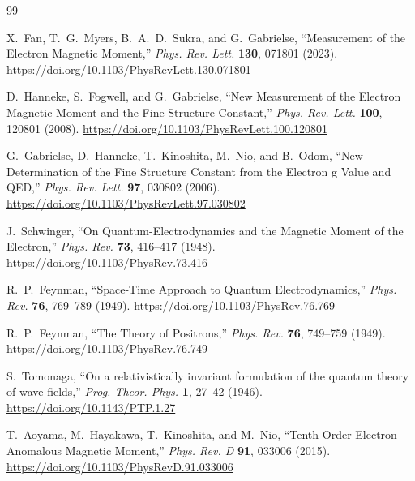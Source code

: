 \documentclass[%
 reprint,
 amsmath,amssymb,
 aps,
]{revtex4-1}
\numberwithin{equation}{section}%
\begin{document}
\begin{thebibliography}{99}

X.~Fan, T.~G.~Myers, B.~A.~D.~Sukra, and G.~Gabrielse, 
``Measurement of the Electron Magnetic Moment,'' 
\textit{Phys. Rev. Lett.} \textbf{130}, 071801 (2023). 
\href{https://doi.org/10.1103/PhysRevLett.130.071801}{https://doi.org/10.1103/PhysRevLett.130.071801}

D.~Hanneke, S.~Fogwell, and G.~Gabrielse, 
``New Measurement of the Electron Magnetic Moment and the Fine Structure Constant,'' 
\textit{Phys. Rev. Lett.} \textbf{100}, 120801 (2008). 
\href{https://doi.org/10.1103/PhysRevLett.100.120801}{https://doi.org/10.1103/PhysRevLett.100.120801}

G.~Gabrielse, D.~Hanneke, T.~Kinoshita, M.~Nio, and B.~Odom, 
``New Determination of the Fine Structure Constant from the Electron g Value and QED,'' 
\textit{Phys. Rev. Lett.} \textbf{97}, 030802 (2006). 
\href{https://doi.org/10.1103/PhysRevLett.97.030802}{https://doi.org/10.1103/PhysRevLett.97.030802}

J.~Schwinger, 
``On Quantum-Electrodynamics and the Magnetic Moment of the Electron,'' 
\textit{Phys. Rev.} \textbf{73}, 416--417 (1948). 
\href{https://doi.org/10.1103/PhysRev.73.416}{https://doi.org/10.1103/PhysRev.73.416}

R.~P.~Feynman, 
``Space-Time Approach to Quantum Electrodynamics,'' 
\textit{Phys. Rev.} \textbf{76}, 769--789 (1949). 
\href{https://doi.org/10.1103/PhysRev.76.769}{https://doi.org/10.1103/PhysRev.76.769}

R.~P.~Feynman, 
``The Theory of Positrons,'' 
\textit{Phys. Rev.} \textbf{76}, 749--759 (1949). 
\href{https://doi.org/10.1103/PhysRev.76.749}{https://doi.org/10.1103/PhysRev.76.749}

S.~Tomonaga, 
``On a relativistically invariant formulation of the quantum theory of wave fields,'' 
\textit{Prog. Theor. Phys.} \textbf{1}, 27--42 (1946). 
\href{https://doi.org/10.1143/PTP.1.27}{https://doi.org/10.1143/PTP.1.27}

T.~Aoyama, M.~Hayakawa, T.~Kinoshita, and M.~Nio, 
``Tenth-Order Electron Anomalous Magnetic Moment,'' 
\textit{Phys. Rev. D} \textbf{91}, 033006 (2015). 
\href{https://doi.org/10.1103/PhysRevD.91.033006}{https://doi.org/10.1103/PhysRevD.91.033006}


\end{thebibliography}
\end{document}
